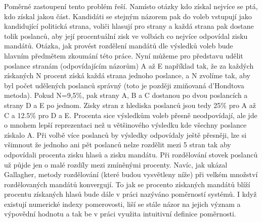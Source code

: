 \documentclass[12pt]{report}
\begin{document}
Poměrné zastoupení tento problém řeší.
Namísto otázky kdo získal nejvíce se ptá, kdo získal jakou část.
Kandidáti se stejným názorem pak do voleb vstupují jako kandidující politická strana, voliči hlasují pro strany a každá strana pak dostane tolik poslanců, aby její procentuální zisk ve volbách co nejvíce odpovídal zisku mandátů.
Otázka, jak provést rozdělení mandátů dle výsledků voleb bude hlavním předmětem zkoumání této práce.
Nyní můžeme pro představu udělit poslance stranám (odpovídajícím názorům) A až E například tak, že za každých získaných N procent získá každá strana jednoho poslance, a N zvolíme tak, aby byl počet udělených poslanců správný (toto je později zmiňovaná d'Hondtova metoda).
Pokud N=9,5\%, pak strany A, B a C dostanou po dvou poslancích a strany D a E po jednom.
Zisky stran z hlediska poslanců jsou tedy 25\% pro A až C a 12.5\% pro D a E.
Procenta sice výsledkům voleb přesně neodpovídají, ale jde o mnohem lepší reprezentaci než u většinového výsledku kde všechny poslance získalo A.
Při volbě více poslanců by výsledky odpovídaly ještě přesněji, lze si všimnout že jednoho ani pět poslanců nelze  rozdělit mezi 5 stran tak aby odpovídali procenta zisku hlasů a zisku mandátu.
Při rozdělování stovek poslanců už půjde jen o malé rozdíly mezi zmíněnými procenty.
Navíc, jak ukázal Gallagher, metody rozdělování (které budou vysvětleny níže) při velkém množství rozdělovaných mandátů konvergují.\autocite{GAL1} To jak se procento získaných mandátů blíží procentu získaných hlasů bude dále v práci nazýváno poměrností systémů.
I když existují numerické indexy pomerovosti, liší se stále názor na jejich význam a výpovědní hodnotu a tak be v práci využita intuitivní definice poměrnosti.\autocite{GAL2}
\end{document}
